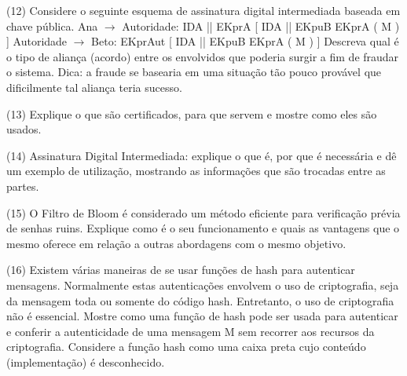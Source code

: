 \documentclass[10pt,a4paper]{report}
\begin{document}
(12) Considere o seguinte esquema de assinatura digital intermediada baseada em chave pública.
Ana $\rightarrow$ Autoridade: IDA || EKprA [ IDA || EKpuB { EKprA ( M ) } ]
Autoridade $\rightarrow$ Beto: EKprAut [ IDA || EKpuB { EKprA ( M ) } ]
Descreva qual é o tipo de aliança (acordo) entre os envolvidos que poderia surgir a fim de fraudar o sistema. Dica: a fraude se basearia em uma situação tão pouco provável que dificilmente tal aliança teria sucesso.

(13) Explique o que são certificados, para que servem e mostre como eles são usados.

(14) Assinatura Digital Intermediada: explique o que é, por que é necessária e dê um exemplo de utilização, mostrando as informações que são trocadas entre as partes.

(15) O Filtro de Bloom é considerado um método eficiente para verificação prévia de senhas ruins. Explique como é o seu funcionamento e quais as vantagens que o mesmo oferece em relação a outras abordagens com o mesmo objetivo.

(16) Existem várias maneiras de se usar funções de hash para autenticar mensagens. Normalmente estas autenticações envolvem o uso de criptografia, seja da mensagem toda ou somente do código hash. Entretanto, o uso de criptografia não é essencial. Mostre como uma função de hash pode ser usada para autenticar e conferir a autenticidade de uma mensagem M sem recorrer aos recursos da criptografia. Considere a função hash como uma caixa preta cujo conteúdo (implementação) é desconhecido.
\end{document}
